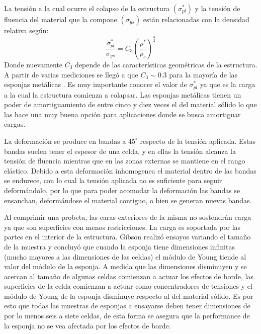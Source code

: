 \documentclass[a4paper,12pt,fleqn,twoside,openany]{book}
\begin{document}
La tensión a la cual ocurre el colapso de la estructura $(\sigma^*_{pl})$ y la tensión de fluencia del material que la compone $(\sigma_{ys})$  
están relacionadas con la densidad relativa \cite{duering} según:
\begin{equation}
 \frac{\sigma^*_{pl}}{\sigma_{ys}}=C_3 \left(\frac{\rho^*}{\rho_s} \right)^{\frac{3}{2}}
\end{equation}
Donde nuevamente $C_3$ depende de las características geométricas de la estructura. A partir de varias mediciones se llegó a que $C_3 \sim 0.3$ para
la mayoría de las esponjas metálicas \cite{gibson}. 
Es muy importante conocer el valor de $\sigma^*_{pl}$ ya que es la carga a la cual la estructura comienza a colapsar.  Las esponjas metálicas tienen 
un poder de amortiguamiento de entre cinco y diez veces el del material sólido \cite{design} lo que las hace una muy buena opción para aplicaciones 
donde se busca amortiguar cargas. 

La deformación se produce en bandas a $45^\circ$ respecto de la tensión aplicada. Estas bandas suelen tener el espesor de una celda, 
y en ellas la tensión alcanza la tensión de fluencia mientras que en las zonas externas se mantiene en el rango elástico. Debido a esta deformación inhomogenea el material dentro de las bandas se endurece, con lo cual la tensión aplicada no es suficiente para seguir deformándolo, por lo que para poder acomodar la deformación las bandas se ensanchan, deformándose el material contiguo, o bien se generan nuevas bandas.     


Al comprimir una probeta, las caras exteriores de la misma no sostendrán carga ya que son superficies con menos restricciones.
La carga es soportada por las partes en el interior de la estructura. Gibson \cite{gibson} realizó ensayos variando el tamaño de la muestra 
y concluyó que cuando la esponja tiene 
dimensiones infinitas (mucho mayores a las dimensiones de las celdas) el módulo de Young tiende al valor del módulo de la esponja. A medida que 
las dimensiones disminuyen y se acercan al tamaño de algunas celdas comienzan a actuar los efectos 
de borde, las superficies de la celda comienzan a actuar como concentradores de tensiones y el módulo de Young de la esponja disminuye respecto al del 
material sólido. Es por esto que todas las muestras de esponjas a ensayarse deben tener dimensiones de por lo menos seis a siete celdas, de esta 
forma se asegura que la performance de la esponja no se vea afectada por los efectos de borde.
\end{document}
